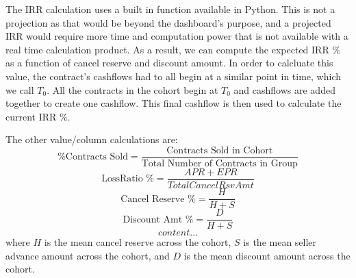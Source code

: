 \documentclass[titlepage]{article}
\begin{document}
The IRR calculation uses a built in function available in Python. This is not a projection as that would be beyond the dashboard's purpose, and a projected IRR would require more time and computation power that is not available with a real time calculation product. As a result, we can compute the expected IRR \% as a function of cancel reserve and discount amount. In order to calcluate this value, the contract's cashflows had to all begin at a similar point in time, which we call $T_0$. All the contracts in the cohort begin at $T_0$ and cashflows are added together to create one cashflow. This final cashflow is then used to calculate the current IRR \%. 

The other value/column calculations are: 
\begin{equation}
\text{\% Contracts Sold} = \frac{\text{Contracts Sold in Cohort}}{\text{Total Number of Contracts in Group}}
\end{equation}
\begin{equation}
\text{LossRatio \%} = \frac{APR + EPR}{TotalCancelRsvAmt}
\end{equation}
\begin{equation}
\text{Cancel Reserve \%} = \frac{H}{H+S}
\end{equation}
\begin{equation}
\text{Discount Amt \%} = \frac{D}{H+S}
\end{equation}
\begin{equation}
content...
\end{equation}
where $H$ is the mean cancel reserve across the cohort, $S$ is the mean seller advance amount across the cohort, and $D$ is the mean discount amount across the cohort.
\newpage
\end{document}
